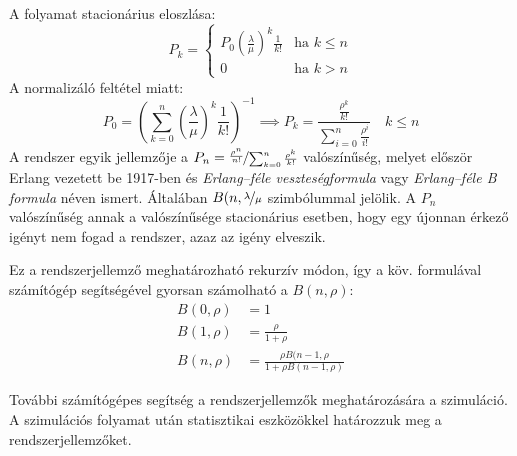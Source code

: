 A folyamat stacionárius eloszlása:
$$P_k=
\begin{cases}
P_0(\frac{\lambda}{\mu})^k\frac{1}{k!} & \text{ha } k\leq n\\
0 & \text{ha } k>n
\end{cases}$$
A normalizáló feltétel miatt:
$$P_0=(\sum_{k=0}^{n}(\frac{\lambda}{\mu})^k\frac{1}{k!})^{-1} \implies
P_k=\frac{\frac{\rho^k}{k!}}{\sum_{i=0}^{n}\frac{\rho^i}{i!}}\quad k\leq n$$
A rendszer egyik jellemzője a $P_n=\nicefrac{\frac{\rho^n}{n!}}{\sum_{k=0}^{n}\frac{\rho^k}{k!}}$ valószínűség, melyet először Erlang vezetett be 1917-ben és \emph{Erlang--féle veszteségformula} vagy \emph{Erlang--féle B formula} néven ismert. Általában $B(n,\nicefrac{\lambda}{\mu}$ szimbólummal jelölik. A $P_n$ valószínűség annak a valószínűsége stacionárius esetben, hogy egy újonnan érkező igényt nem fogad a rendszer, azaz az igény elveszik.

Ez a rendszerjellemző meghatározható rekurzív módon, így a köv. formulával számítógép segítségével gyorsan számolható a $B(n,\rho)$:
\begin{align*}
	B(0,\rho)&=1\\
	B(1,\rho)&=\frac{\rho}{1+\rho}\\
	B(n,\rho)&=\frac{\rho B(n-1,\rho}{1+\rho B(n-1,\rho)}
\end{align*}

További számítógépes segítség a rendszerjellemzők meghatározására a szimuláció. A szimulációs folyamat után statisztikai eszközökkel határozzuk meg a rendszerjellemzőket.

